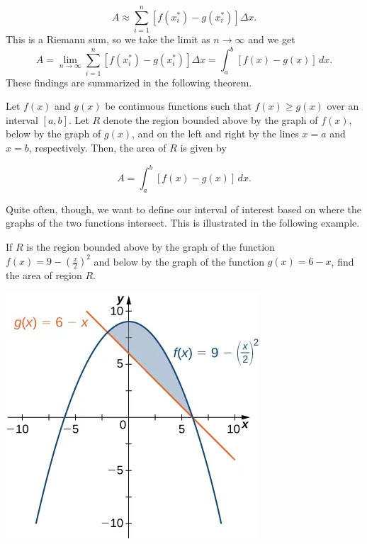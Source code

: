 \documentclass{report}
\begin{document}
    \[
    A \approx \sum_{i=1}^{n} \left[ f(x^*_i) - g(x^*_i) \right] \Delta x.
    \]
    \bigbreak \noindent 
    This is a Riemann sum, so we take the limit as \( n \to \infty \) and we get
    \[
    A = \lim_{{n \to \infty}} \sum_{i=1}^{n} \left[ f(x^*_i) - g(x^*_i) \right] \Delta x = \int_{a}^{b} \left[ f(x) - g(x) \right] \, dx.
    \]
    \bigbreak \noindent 
    These findings are summarized in the following theorem.
    \bigbreak \noindent 
    \begin{thrm}
       Let \( f(x) \) and \( g(x) \) be continuous functions such that \( f(x) \geq g(x) \) over an interval \([a, b]\).
Let \( R \) denote the region bounded above by the graph of \( f(x) \), below by the graph of \( g(x) \), and on the left and right by the lines \( x = a \) and \( x = b \), respectively. Then, the area of \( R \) is given by

    \[
    A = \int_{a}^{b} \left[ f(x) - g(x) \right] \, dx.
    \] 
    \end{thrm}
    \bigbreak \noindent 
    Quite often, though, we want to define our interval of interest based on where the graphs of the two functions intersect. This is illustrated in the following example.
    \smallbreak \noindent
    \begin{eg}
       If \( R \) is the region bounded above by the graph of the function \( f(x) = 9 - \left( \frac{x}{2} \right)^2 \) and below by the graph of the function \( g(x) = 6 - x \), find the area of region \( R \).
    \end{eg}
    \bigbreak \noindent \bigbreak \noindent 
    \begin{minipage}{0.47\textwidth}
    \begin{center}
        \includegraphics[scale=.35]{ ./figures/graph3.png}
    \end{center}
    \end{minipage}
\end{document}

